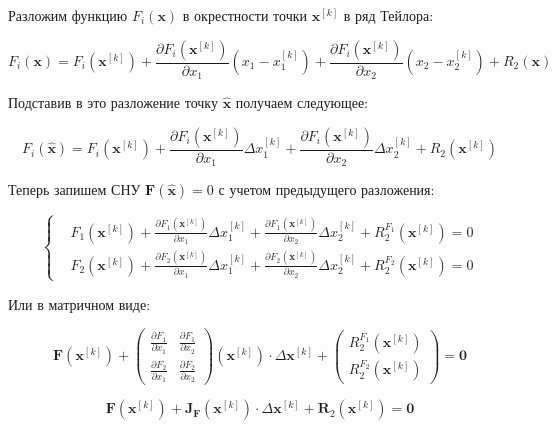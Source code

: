 \documentclass[12pt, a4paper]{article}
\newcommand{\roubr}[1]{\left(#1\right)}
\begin{document}
Разложим функцию $F_i\roubr{\mathbf{x}}$ в окрестности точки $\mathbf{x}^{[k]}$ в ряд Тейлора:

$$ F_i\roubr{\mathbf{x}} = F_i\roubr{\mathbf{x}^{[k]}} + \frac{\partial F_i\roubr{\mathbf{x}^{[k]}}}{\partial x_1} \roubr{x_1 - x^{[k]}_1} + \frac{\partial F_i\roubr{\mathbf{x}^{[k]}}}{\partial x_2} \roubr{x_2 - x^{[k]}_2} + R_2\roubr{\mathbf{x}} $$

Подставив в это разложение точку $\hat{\mathbf{x}}$ получаем следующее:

$$\displaystyle F_i\roubr{\hat{\mathbf{x}}} = F_i\roubr{\mathbf{x}^{[k]}} + \frac{\partial F_i\roubr{\mathbf{x}^{[k]}}}{\partial x_1} \Delta x^{[k]}_1 + \frac{\partial F_i\roubr{\mathbf{x}^{[k]}}}{\partial x_2} \Delta x^{[k]}_2 + R_2\roubr{\mathbf{x}^{[k]}} $$

Теперь запишем СНУ $\mathbf{F}\roubr{\hat{\mathbf{x}}} = 0$ с учетом предыдущего разложения:

$$ \left\{
\begin{aligned}
& F_1\roubr{\mathbf{x}^{[k]}} + \frac{\partial F_1\roubr{\mathbf{x}^{[k]}}}{\partial x_1} \Delta x^{[k]}_1 + \frac{\partial F_1\roubr{\mathbf{x}^{[k]}}}{\partial x_2} \Delta x^{[k]}_2 + R^{F_1}_2\roubr{\mathbf{x}^{[k]}} = 0 \\
& F_2\roubr{\mathbf{x}^{[k]}} + \frac{\partial F_2\roubr{\mathbf{x}^{[k]}}}{\partial x_1} \Delta x^{[k]}_1 + \frac{\partial F_2\roubr{\mathbf{x}^{[k]}}}{\partial x_2} \Delta x^{[k]}_2 + R^{F_2}_2\roubr{\mathbf{x}^{[k]}} = 0
\end{aligned}
\right.$$

Или в матричном виде:

$$
\mathbf{F}\roubr{\mathbf{x}^{[k]}} + 
\begin{pmatrix}
\displaystyle \frac{\partial F_1}{\partial x_1} & \displaystyle \frac{\partial F_1}{\partial x_2} \\
\displaystyle \frac{\partial F_2}{\partial x_1} & \displaystyle \frac{\partial F_2}{\partial x_2}
\end{pmatrix} \roubr{\mathbf{x}^{[k]}} \cdot \Delta \mathbf{x}^{[k]} + \begin{pmatrix}
\displaystyle R^{F_1}_2\roubr{\mathbf{x}^{[k]}} \\
\displaystyle R^{F_2}_2\roubr{\mathbf{x}^{[k]}}
\end{pmatrix} = \mathbf{0}
$$

$$
\mathbf{F}\roubr{\mathbf{x}^{[k]}} + \mathbf{J}_\mathbf{F}\roubr{\mathbf{x}^{[k]}} \cdot \Delta \mathbf{x}^{[k]} + \mathbf{R}_2\roubr{\mathbf{x}^{[k]}} = \mathbf{0}
$$
\end{document}
